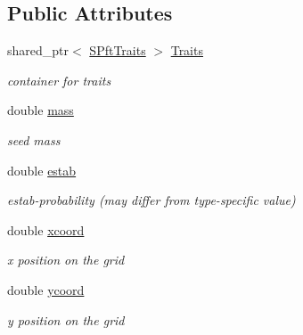 \subsection*{Public Attributes}
\begin{DoxyCompactItemize}
\item 
\mbox{\label{class_c_seed_a538975a8caa9dedbc77143146fad1c38}} 
shared\+\_\+ptr$<$ \mbox{\hyperlink{class_s_pft_traits}{S\+Pft\+Traits}} $>$ \mbox{\hyperlink{class_c_seed_a538975a8caa9dedbc77143146fad1c38}{Traits}}
\begin{DoxyCompactList}\small\item\em container for traits \end{DoxyCompactList}\item 
\mbox{\label{class_c_seed_a25f9e474c81f03b03fcc63eeb268b8db}} 
double \mbox{\hyperlink{class_c_seed_a25f9e474c81f03b03fcc63eeb268b8db}{mass}}
\begin{DoxyCompactList}\small\item\em seed mass \end{DoxyCompactList}\item 
\mbox{\label{class_c_seed_ae9b71bc4ff10218aade80211c89fedaf}} 
double \mbox{\hyperlink{class_c_seed_ae9b71bc4ff10218aade80211c89fedaf}{estab}}
\begin{DoxyCompactList}\small\item\em estab-\/probability (may differ from type-\/specific value) \end{DoxyCompactList}\item 
\mbox{\label{class_c_seed_ac54637f36f1c5ffbbc43a5cf84298ec3}} 
double \mbox{\hyperlink{class_c_seed_ac54637f36f1c5ffbbc43a5cf84298ec3}{xcoord}}
\begin{DoxyCompactList}\small\item\em x position on the grid \end{DoxyCompactList}\item 
\mbox{\label{class_c_seed_a965add8cd635b902a1777371e6a1d1b4}} 
double \mbox{\hyperlink{class_c_seed_a965add8cd635b902a1777371e6a1d1b4}{ycoord}}
\begin{DoxyCompactList}\small\item\em y position on the grid \end{DoxyCompactList}\item 

\end{DoxyCompactItemize}
